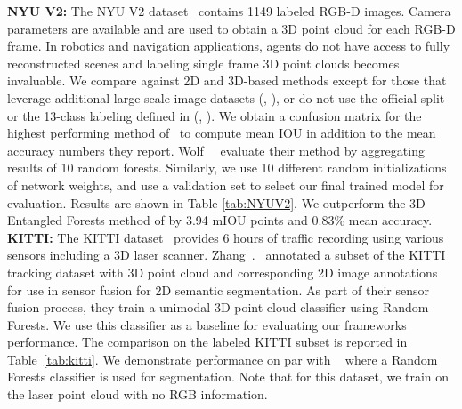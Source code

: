 \documentclass[10pt,twocolumn,letterpaper]{article}
\begin{document}
\textbf{NYU V2: }The NYU V2 dataset~\cite{Silberman:ECCV12} contains 1149 labeled RGB-D images. Camera parameters are available and are used to obtain a 3D point cloud for each RGB-D frame. In robotics and navigation applications, agents do not have access to fully reconstructed scenes and labeling single frame 3D point clouds becomes invaluable. We compare against 2D and 3D-based methods except for those that leverage additional large scale image datasets (\eg \cite{Kim2013}, \cite{eigen2015}), or do not use the official split or the 13-class labeling defined in \cite{couprie2013} (\eg \cite{Kim2013}, \cite{Wolf2015}). We obtain a confusion matrix for the highest performing method of~\cite{Wolf2016} to compute mean IOU in addition to the mean accuracy numbers they report. Wolf~\etal~\cite{Wolf2016} evaluate their method by aggregating results of 10 random forests. Similarly, we use 10 different random initializations of network weights, and use a validation set to select our final trained model for evaluation. Results are shown in Table \ref{tab:NYUV2}. We outperform the 3D Entangled Forests method of \cite{Wolf2016} by 3.94 mIOU points and 0.83\% mean accuracy. \\

\textbf{KITTI: }The KITTI dataset~\cite{Geiger2013IJRR,Geiger:2012:WRA:2354409.2354978} provides 6 hours of traffic recording using various sensors including a 3D laser scanner. Zhang~\etal.~\cite{Zhang2015} annotated a subset of the KITTI tracking dataset with 3D point cloud and corresponding 2D image annotations for use in sensor fusion for 2D semantic segmentation. As part of their sensor fusion process, they train a unimodal 3D point cloud classifier using Random Forests. 
We use this classifier as a baseline for evaluating our framework\textquotesingle s performance. The comparison on the labeled KITTI subset is reported in Table~\ref{tab:kitti}. We demonstrate performance on par with ~\cite{Zhang2015} where a Random Forests classifier is used for segmentation. Note that for this dataset, we train on the laser point cloud with no RGB information.\\
\end{document}
